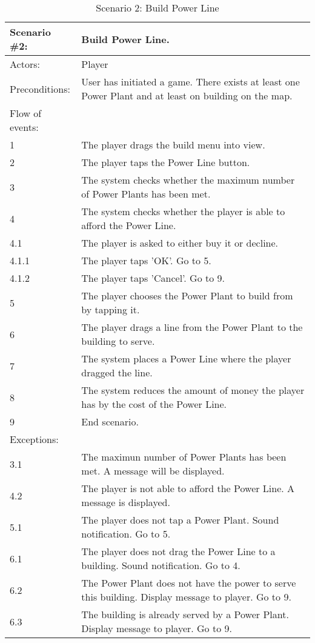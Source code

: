 \begin{table}
	\begin{tabular}{| l | p{10cm} |}
		\hline
		\rowcolor{lightgray}
		{\bf Scenario \#2:} & {\bf Build Power Line.} \\ \hline
		Actors: & Player \\ \hline
		Preconditions: & User has initiated a game. There exists at least one Power Plant and at least on building on the map. \\ \hline
		\rowcolor{lightergray}
		Flow of events: & \\ \hline
		1 & The player drags the build menu into view. \\ \hline
		2 & The player taps the Power Line button. \\ \hline
		3 & The system checks whether the maximum number of Power Plants has been met. \\ \hline
		4 & The system checks whether the player is able to afford the Power Line. \\ \hline
		4.1 & The player is asked to either buy it or decline. \\ \hline
		4.1.1 & The player taps 'OK'. Go to 5. \\ \hline
		4.1.2 & The player taps 'Cancel'. Go to 9. \\ \hline
		5 & The player chooses the Power Plant to build from by tapping it. \\ \hline
		6 & The player drags a line from the Power Plant to the building to serve. \\ \hline
		7 & The system places a Power Line where the player dragged the line. \\ \hline
		8 & The system reduces the amount of money the player has by the cost of the Power Line. \\ \hline
		9 & End scenario. \\ \hline
		\rowcolor{lightergray}
		Exceptions: & \\ \hline
		3.1 & The maximun number of Power Plants has been met. A message will be displayed. \\ \hline
		4.2 & The player is not able to afford the Power Line. A message is displayed. \\ \hline
		5.1 & The player does not tap a Power Plant. Sound notification. Go to 5. \\ \hline
		6.1 & The player does not drag the Power Line to a building. Sound notification. Go to 4. \\ \hline
		6.2 & The Power Plant does not have the power to serve this building. Display message to player. Go to 9. \\ \hline
		6.3 & The building is already served by a Power Plant. Display message to player. Go to 9. \\ \hline
	\end{tabular}
\caption{Scenario 2: Build Power Line}
\end{table}

